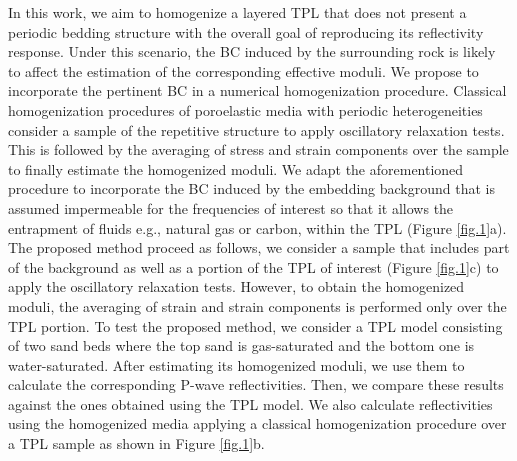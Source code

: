 \documentclass[draft]{agujournal2019}
\begin{document}
In this work, we aim to homogenize a layered TPL that does not present a periodic bedding structure with the overall goal of reproducing its reflectivity response. Under this scenario, the BC induced by the surrounding rock is likely to affect the estimation of the corresponding effective moduli. We
propose to incorporate the pertinent BC in a numerical homogenization procedure.
Classical homogenization procedures of poroelastic media with periodic heterogeneities consider a sample of the repetitive structure to apply oscillatory relaxation tests. This is followed by the averaging of stress and strain components over the sample to finally estimate the homogenized moduli. We adapt the aforementioned procedure to incorporate the BC induced by the embedding background that is assumed impermeable for the frequencies of interest so that it allows the entrapment of fluids e.g., natural gas or carbon, within the TPL (Figure \ref{fig.1}a). The proposed method proceed as follows,
we consider a sample that includes part of the background as well as a portion of the TPL of interest (Figure \ref{fig.1}c) to apply the oscillatory relaxation tests. However, to obtain the homogenized moduli, the averaging of strain and strain components is performed only over the TPL portion. To test the proposed method, we consider a TPL model consisting of two sand beds where the top sand is gas-saturated  and the bottom one is water-saturated.
After estimating its  homogenized moduli, we use them to calculate the corresponding P-wave reflectivities. Then, we compare these results against the ones obtained using the TPL model. We also calculate reflectivities using the homogenized media applying a classical homogenization procedure over a TPL sample as shown in Figure \ref{fig.1}b.


\end{document}
